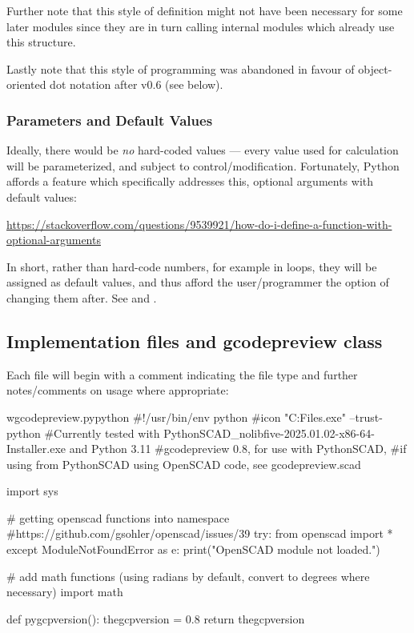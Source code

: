 \documentclass{ltxdoc}
\begin{document}
Further note that this style of definition might not have been necessary for some later modules since they are in turn calling internal modules which already use this structure.

Lastly note that this style of programming was abandoned in favour of object-oriented dot notation after v0.6 (see below).

\subsubsection{Parameters and Default Values}

Ideally, there would be \emph{no} hard-coded values --- every value used for calculation will be parameterized, and subject to control/modification. Fortunately, Python affords a feature which specifically addresses this, optional arguments with default values:

\noindent\url{https://stackoverflow.com/questions/9539921/how-do-i-define-a-function-with-optional-arguments}

In short, rather than hard-code numbers, for example in loops, they will be assigned as default values, and thus afford the user/programmer the option of changing them after. See  and .

\subsection{Implementation files and gcodepreview class}
 
Each file will begin with a comment indicating the file type and further notes/comments on usage where appropriate:

\begin{writecode}{w}{gcodepreview.py}{python}
#!/usr/bin/env python
#icon "C:\Program Files\PythonSCAD\bin\openscad.exe"  --trust-python
#Currently tested with PythonSCAD_nolibfive-2025.01.02-x86-64-Installer.exe and Python 3.11
#gcodepreview 0.8, for use with PythonSCAD, 
#if using from PythonSCAD using OpenSCAD code, see gcodepreview.scad

import sys

# getting openscad functions into namespace
#https://github.com/gsohler/openscad/issues/39
try:
    from openscad import *
except ModuleNotFoundError as e:
    print("OpenSCAD module not loaded.")
    
# add math functions (using radians by default, convert to degrees where necessary)
import math

def pygcpversion():
    thegcpversion = 0.8
    return thegcpversion

\end{writecode}
\addtocounter{gcpy}{23}
\end{document}

